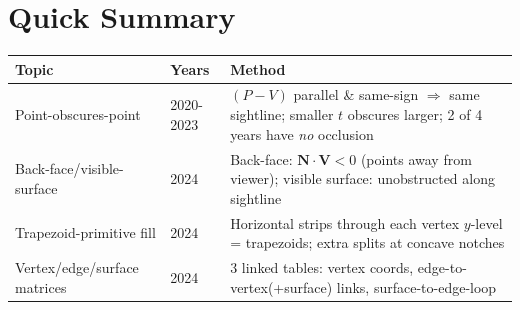 \documentclass[12pt, a4paper]{article}
\begin{document}
\section{Quick Summary}
\begin{center}
\renewcommand{\arraystretch}{1.3}
\begin{tabular}{p{4.6cm}|p{2.2cm}|p{6.8cm}}
\toprule
\textbf{Topic} & \textbf{Years} & \textbf{Method} \\
\midrule
Point-obscures-point & 2020-2023 & $(P-V)$ parallel \& same-sign $\Rightarrow$ same sightline; smaller $t$ obscures larger; 2 of 4 years have \emph{no} occlusion \\
Back-face/visible-surface & 2024 & Back-face: $\mathbf{N}\cdot\mathbf{V}<0$ (points away from viewer); visible surface: unobstructed along sightline \\
Trapezoid-primitive fill & 2024 & Horizontal strips through each vertex $y$-level = trapezoids; extra splits at concave notches \\
Vertex/edge/surface matrices & 2024 & 3 linked tables: vertex coords, edge-to-vertex(+surface) links, surface-to-edge-loop \\
\bottomrule
\end{tabular}
\end{center}
\end{document}
